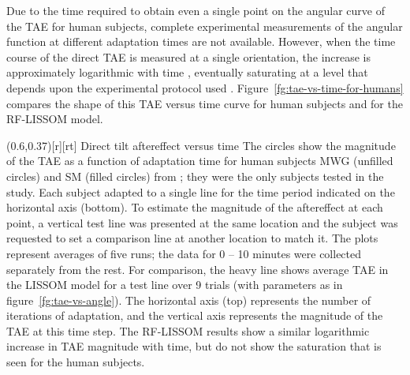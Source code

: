\documentclass[10pt]{article}   %
\begin{document}
Due to the time required to obtain even a single point on the angular
curve of the TAE for human subjects, complete experimental
measurements of the angular function at different adaptation times are
not available.  However, when the time course of the direct TAE is
measured at a single orientation, the increase is approximately
logarithmic with time \cite{gibson:adaptation}, eventually saturating
at a level that depends upon the experimental protocol used
\cite{greenlee:vres87sat,magnussen:vres86}.
Figure~\ref{fg:tae-vs-time-for-humans} compares the shape of this TAE
versus time curve for human subjects and for the RF-LISSOM model.
\begin{figure*}
  \centering
  \parpic(0.6\textwidth,0.37\textwidth)[r][rt]{%
    }
  \vspace*{-2.6ex}
  {Direct tilt aftereffect versus time}
  {The circles show the magnitude of the TAE as a function of
    adaptation time for human subjects MWG (unfilled circles) and SM
    (filled circles) from ; they were the
    only subjects tested in the study.  Each subject adapted to a
    single \degree line for the time period indicated on the
    horizontal axis (bottom).  To estimate the magnitude of the
    aftereffect at each point, a vertical test line was presented at
    the same location and the subject was requested to set a
    comparison line at another location to match it.  The plots
    represent averages of five runs; the data for 0 -- 10 minutes were
    collected separately from the rest.
    For comparison, the heavy line shows average TAE in the LISSOM 
    model for a \degree test line over 9 trials (with parameters as in
    figure~\ref{fg:tae-vs-angle}).  The horizontal axis (top)
    represents the number of iterations  of adaptation, and the
    vertical axis represents the magnitude of the TAE at this time
    step.
    The RF-LISSOM results show a similar logarithmic increase in TAE
    magnitude with time, but do not show the saturation that is seen
    for the human subjects.}
\end{figure*}%
\end{document}

